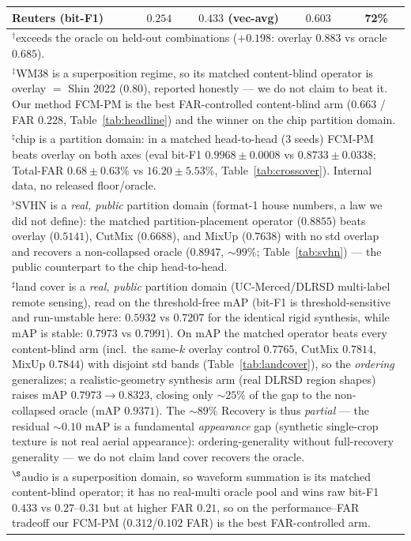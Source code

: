 \documentclass[11pt]{article}
\begin{document}
\begin{table}[t]
\begin{tabular}{lcccc}
Reuters (bit-F1)   & $0.254$ & $0.433$ (vec-avg) & $0.603$ & 72\% \\
\bottomrule
\multicolumn{5}{l}{\footnotesize $^{\dagger}$exceeds the oracle on held-out combinations ($+0.198$: overlay $0.883$ vs oracle $0.685$).}\\
\multicolumn{5}{l}{\footnotesize $^{\ddagger}$WM38 is a superposition regime, so its matched content-blind operator is overlay $=$ Shin 2022 ($0.80$), reported honestly --- we do not claim to beat it. Our method FCM-PM is the best FAR-controlled content-blind arm ($0.663$ / FAR $0.228$, Table~\ref{tab:headline}) and the winner on the chip partition domain.}\\
\multicolumn{5}{l}{\footnotesize $^{\natural}$chip is a partition domain: in a matched head-to-head (3 seeds) FCM-PM beats overlay on both axes (eval bit-F1 $0.9968 \pm 0.0008$ vs $0.8733 \pm 0.0338$; Total-FAR $0.68 \pm 0.63\%$ vs $16.20 \pm 5.53\%$, Table~\ref{tab:crossover}). Internal data, no released floor/oracle.}\\
\multicolumn{5}{l}{\footnotesize $^{\flat}$SVHN is a \emph{real, public} partition domain (format-1 house numbers, a law we did not define): the matched partition-placement operator ($0.8855$) beats overlay ($0.5141$), CutMix ($0.6688$), and MixUp ($0.7638$) with no std overlap and recovers a non-collapsed oracle ($0.8947$, ${\sim}99\%$; Table~\ref{tab:svhn}) --- the public counterpart to the chip head-to-head.}\\
\multicolumn{5}{l}{\footnotesize $^{\sharp}$land cover is a \emph{real, public} partition domain (UC-Merced/DLRSD multi-label remote sensing), read on the threshold-free mAP (bit-F1 is threshold-sensitive and run-unstable here: $0.5932$ vs $0.7207$ for the identical rigid synthesis, while mAP is stable: $0.7973$ vs $0.7991$). On mAP the matched operator beats every content-blind arm (incl.\ the same-$k$ overlay control $0.7765$, CutMix $0.7814$, MixUp $0.7844$) with disjoint std bands (Table~\ref{tab:landcover}), so the \emph{ordering} generalizes; a realistic-geometry synthesis arm (real DLRSD region shapes) raises mAP $0.7973 \to 0.8323$, closing only ${\sim}25\%$ of the gap to the non-collapsed oracle (mAP $0.9371$). The ${\sim}89\%$ Recovery is thus \emph{partial} --- the residual ${\sim}0.10$ mAP is a fundamental \emph{appearance} gap (synthetic single-crop texture is not real aerial appearance): ordering-generality without full-recovery generality --- we do not claim land cover recovers the oracle.}\\
\multicolumn{5}{l}{\footnotesize $^{\S}$audio is a superposition domain, so waveform summation is its matched content-blind operator; it has no real-multi oracle pool and wins raw bit-F1 $0.433$ vs $0.27$--$0.31$ but at higher FAR $0.21$, so on the performance--FAR tradeoff our FCM-PM ($0.312$/$0.102$ FAR) is the best FAR-controlled arm.}\\

\end{tabular}
\end{table}
\end{document}
